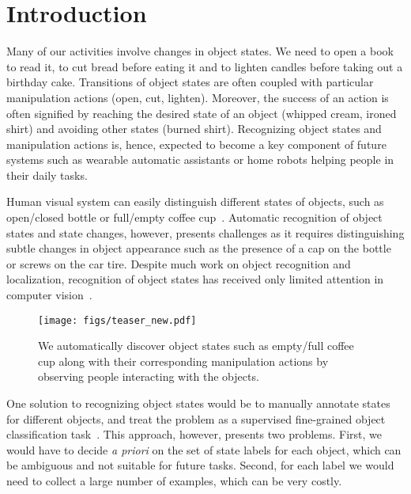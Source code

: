 \vspace*{-3mm}
\section{Introduction}
\label{sec:intro}

Many of our activities involve changes in object states.
We need to open a book to read it, to cut bread before eating it and to lighten candles before taking out a birthday cake.
Transitions of object states are often coupled with particular manipulation actions (open, cut, lighten).
Moreover, the success of an action is often signified by reaching the desired state of an object (whipped cream, ironed shirt) and avoiding other states (burned shirt).
Recognizing object states and manipulation actions is, hence, expected to become a key component of future systems such as wearable automatic assistants or home robots helping people in their daily tasks. 


Human visual system can easily distinguish different states of objects, such as open/closed bottle or full/empty coffee cup~\cite{Brady06}.
%
%
%
Automatic recognition of object states and state changes, however, presents challenges as it requires distinguishing subtle changes in object appearance such as the presence of a cap on the bottle or screws on the car tire. %
Despite much work on object recognition and localization, recognition of object states has received only limited attention in computer vision~\cite{Isola15State}.


\begin{figure}
    \centering
    \texttt{[image: figs/teaser\_new.pdf]}
    \caption{We automatically discover object states such as empty/full coffee cup along with their corresponding manipulation actions by observing people interacting with the objects.}
    \label{fig:teaser}
    \vspace*{-5mm}
\end{figure}

One solution to recognizing object states would be to manually annotate states for different objects,
%
and treat the problem as a supervised fine-grained object classification task~\cite{duan2012discovering,Farhadi09ObjectsAttrib}. This approach, however, presents two problems. First, we would have to decide {\em a priori} on the set of state labels for each object, which can be ambiguous and not suitable for future tasks. Second, for each label we would need to collect a large number of examples, which can be very costly.

